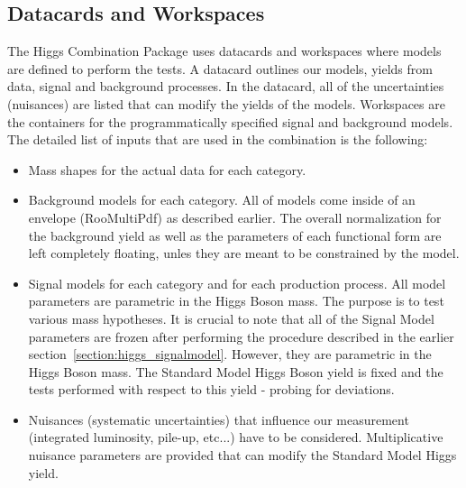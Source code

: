 \subsection{Datacards and Workspaces}
The Higgs Combination Package uses datacards and workspaces where models
are defined to perform the tests. A datacard outlines our models, yields
from data, signal and background processes. In the datacard, all
of the uncertainties (nuisances) are listed that can modify the yields of the models.
Workspaces are the containers for the programmatically specified signal and
background models. The detailed list of inputs that are used in the combination
 is the following:
\begin{itemize}
    \item Mass shapes for the actual data for each category.
    \item Background models for each category. All of models come inside of an envelope (RooMultiPdf) as described earlier. The overall normalization for the background yield as well as the parameters of each functional form are left completely floating, unles they are meant to be constrained by the model.
    \item Signal models for each category and for each production process. All model parameters are parametric in the Higgs Boson mass. The purpose is to test various mass hypotheses. It is crucial to note that all of the Signal Model parameters are frozen after performing the procedure described in the earlier section~\ref{section:higgs_signalmodel}. However, they are parametric in the Higgs Boson mass. The Standard Model Higgs Boson yield is fixed and the tests performed with respect to this yield - probing for deviations.
    \item Nuisances (systematic uncertainties) that influence our measurement (integrated luminosity, pile-up, etc...) have to be considered. Multiplicative nuisance parameters are provided that can modify the Standard Model Higgs yield.
\end{itemize}

